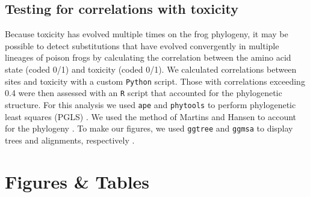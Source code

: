 \documentclass{article}
\begin{document}
\subsection*{Testing for correlations with toxicity}

Because toxicity has evolved multiple times on the frog phylogeny, it may be possible to detect substitutions that have evolved convergently in multiple lineages of poison frogs by calculating the correlation between the amino acid state (coded 0/1) and toxicity (coded 0/1). We calculated correlations between sites and toxicity with a custom \texttt{Python} script. Those with correlations exceeding 0.4 were then assessed with an \texttt{R} script that accounted for the phylogenetic structure. For this analysis we used \texttt{ape} and \texttt{phytools} to perform phylogenetic least squares (PGLS) \citep{paradis2004ape,revell2012phytools}. We used the method of Martins and Hansen to account for the phylogeny \citep{martins1997phylogenies}. 
To make our figures, we used \texttt{ggtree} and \texttt{ggmsa} to display trees and alignments, respectively \cite{yu2017ggtree,zhou2022ggmsa}. 


\clearpage
\linespread{1}\selectfont
\section*{Figures \& Tables}
\end{document}
